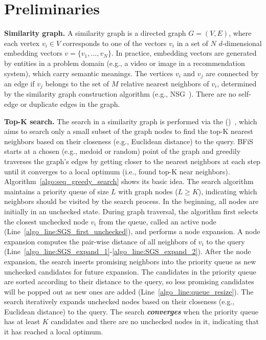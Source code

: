 \vspace{-1em}
\section{Preliminaries}
\label{sec:preliminaries}

\noindent
\textbf{Similarity graph.} A similarity graph is a directed graph $G=(V, E)$, where each vertex $v_i \in V$ corresponds to one of the vectors $v_i$ in a set of $N$ $d$-dimensional embedding vectors $v=\{v_1,...,v_N\}$. In practice, embedding vectors are generated by entities in a problem domain (e.g., a video or image in a recommendation system), which carry semantic meanings. The vertices $v_i$ and $v_j$ are connected by an edge if $v_j$ belongs to the set of $M$ relative nearest neighbors of $v_i$, determined by the similarity graph construction algorithm (e.g., NSG~\cite{fu2019fast}). There are no self-edge or duplicate edges in the graph. 

\noindent
\textbf{Top-K search.} The search in a similarity graph is performed via the \SeqFullName (\SeqShortName)~\cite{fu2019fast}, which aims to search only a small subset of the graph nodes to find the top-K nearest neighbors based on their closeness (e.g., Euclidean distance) to the query. BFiS starts at a chosen (e.g., medoid or random) point of the graph and greedily traverses the graph's edges by getting closer to the nearest neighbors at each step until it converges to a local optimum  (i.e., found top-K near neighbors). Algorithm~\ref{algo:seq_greedy_search} shows its basic idea. The search algorithm maintains a priority queue of size $L$ with graph nodes ($L \ge K$), indicating which neighbors should be visited by the search process. In the beginning, all nodes are initially in an unchecked state. During graph traversal, the algorithm first selects the closest unchecked node $v_i$ from the queue, called an active node (Line~\ref{algo_line:SGS_first_unchecked}), and performs a node expansion. A node expansion computes the pair-wise distance of all neighbors of $v_i$ to the query (Line~\ref{algo_line:SGS_expand_1}-\ref{algo_line:SGS_expand_2}). After the node expansion, the search inserts promising neighbors into the priority queue as new unchecked candidates for future expansion. The candidates in the priority queue are sorted according to their distance to the query, so less promising candidates will be popped out as new ones are added (Line~\ref{algo_line:queue_resize}). The search iteratively expands unchecked nodes based on their closeness (e.g., Euclidean distance) to the query. The search \textbf{\emph{converges}} when the priority queue has at least $K$ candidates and there are no unchecked nodes in it, indicating that it has reached a local optimum. 

